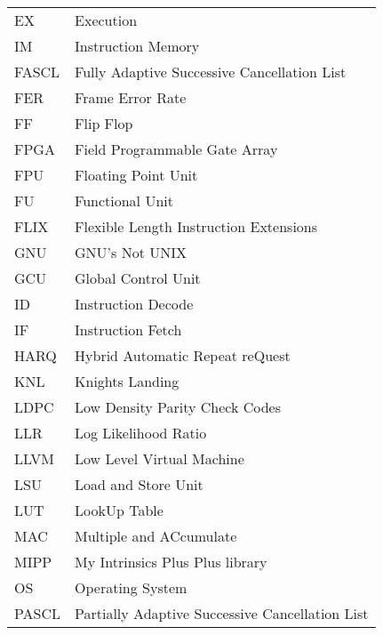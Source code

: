 \begin{center}
\begin{longtable}{ p{}  p{} }
EX        & Execution                                              \\
IM        & Instruction Memory                                     \\
FASCL     & Fully Adaptive Successive Cancellation List            \\
FER       & Frame Error Rate                                       \\
FF        & Flip Flop                                              \\
FPGA      & Field Programmable Gate Array                          \\
FPU       & Floating Point Unit                                    \\
FU        & Functional Unit                                        \\
FLIX      & Flexible Length Instruction Extensions                 \\
GNU       & GNU’s Not UNIX                                         \\
GCU       & Global Control Unit                                    \\
ID        & Instruction Decode                                     \\
IF        & Instruction Fetch                                      \\
HARQ      & Hybrid Automatic Repeat reQuest                        \\
KNL       & Knights Landing                                        \\
LDPC      & Low Density Parity Check Codes                         \\
LLR       & Log Likelihood Ratio                                   \\
LLVM      & Low Level Virtual Machine                              \\
LSU       & Load and Store Unit                                    \\
LUT       & LookUp Table                                           \\
MAC       & Multiple and ACcumulate                                \\
MIPP      & My Intrinsics Plus Plus library                        \\
OS        & Operating System                                       \\
PASCL     & Partially Adaptive Successive Cancellation List        \\

\end{longtable}
\end{center}

